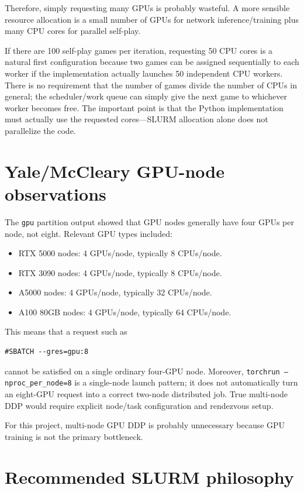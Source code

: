 \documentclass[11pt]{article}
\begin{document}
Therefore, simply requesting many GPUs is probably wasteful. A more sensible resource allocation is a small number of GPUs for network inference/training plus many CPU cores for parallel self-play.

If there are 100 self-play games per iteration, requesting 50 CPU cores is a natural first configuration because two games can be assigned sequentially to each worker if the implementation actually launches 50 independent CPU workers. There is no requirement that the number of games divide the number of CPUs in general; the scheduler/work queue can simply give the next game to whichever worker becomes free. The important point is that the Python implementation must actually use the requested cores---SLURM allocation alone does not parallelize the code.

\section{Yale/McCleary GPU-node observations}

The \texttt{gpu} partition output showed that GPU nodes generally have four GPUs per node, not eight. Relevant GPU types included:

\begin{itemize}
    \item RTX 5000 nodes: 4 GPUs/node, typically 8 CPUs/node.
    \item RTX 3090 nodes: 4 GPUs/node, typically 8 CPUs/node.
    \item A5000 nodes: 4 GPUs/node, typically 32 CPUs/node.
    \item A100 80GB nodes: 4 GPUs/node, typically 64 CPUs/node.
\end{itemize}

This means that a request such as

\begin{verbatim}
#SBATCH --gres=gpu:8
\end{verbatim}

cannot be satisfied on a single ordinary four-GPU node. Moreover, \texttt{torchrun --nproc\_per\_node=8} is a single-node launch pattern; it does not automatically turn an eight-GPU request into a correct two-node distributed job. True multi-node DDP would require explicit node/task configuration and rendezvous setup.

For this project, multi-node GPU DDP is probably unnecessary because GPU training is not the primary bottleneck.

\section{Recommended SLURM philosophy}
\end{document}

